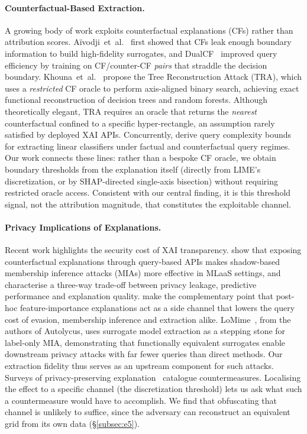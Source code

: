 \documentclass[sigconf,anonymous,review]{acmart}
\begin{document}
\paragraph{Counterfactual-Based Extraction.}
A growing body of work exploits counterfactual explanations (CFs) rather than
attribution scores.
A\"ivodji~et~al.~\cite{aivodji2020model} first showed that CFs leak enough
boundary information to build high-fidelity surrogates, and DualCF~\cite{wang2022dualcf}
improved query efficiency by training on CF/counter-CF \emph{pairs} that
straddle the decision boundary.
Khouna~et~al.~\cite{khouna2025tra} propose the Tree Reconstruction Attack (TRA),
which uses a \emph{restricted} CF oracle to perform axis-aligned binary search,
achieving exact functional reconstruction of decision trees and random forests.
Although theoretically elegant, TRA requires an oracle that returns the
\emph{nearest} counterfactual confined to a specific hyper-rectangle, an assumption rarely satisfied by deployed XAI APIs.
Concurrently, \citet{otto2026linear} derive query complexity bounds for extracting
linear classifiers under factual and counterfactual query regimes.
Our work connects these lines: rather than a bespoke CF oracle, we obtain boundary
thresholds from the explanation itself (directly from LIME's discretization, or by SHAP-directed single-axis bisection) without requiring restricted oracle access.
Consistent with our central finding, it is this threshold signal, not the attribution
magnitude, that constitutes the exploitable channel.

\paragraph{Privacy Implications of Explanations.}
Recent work highlights the security cost of XAI transparency.
\citet{ezzeddine2026membership} show that exposing counterfactual explanations through query-based
APIs makes shadow-based membership inference attacks (MIAs) more effective in MLaaS settings, and
characterise a three-way trade-off between privacy leakage, predictive performance and explanation
quality.
\citet{quan2022amplification} make the complementary point that post-hoc feature-importance
explanations act as a side channel that lowers the query cost of evasion, membership inference and
extraction alike.
LoMime~\cite{oksuz2026lomime}, from the authors of Autolycus, uses surrogate model
extraction as a stepping stone for label-only MIA, demonstrating that functionally
equivalent surrogates enable downstream privacy attacks with far fewer queries than direct methods. Our extraction fidelity thus serves as an upstream component for such
attacks.
Surveys of privacy-preserving explanation~\cite{nguyen2024survey} catalogue
countermeasures. Localising the effect to a specific channel (the discretization
threshold) lets us ask what such a countermeasure would have to accomplish. We find that obfuscating that channel is unlikely to suffice, since the adversary can
reconstruct an equivalent grid from its own data (\S\ref{subsec:e5}).
\end{document}
